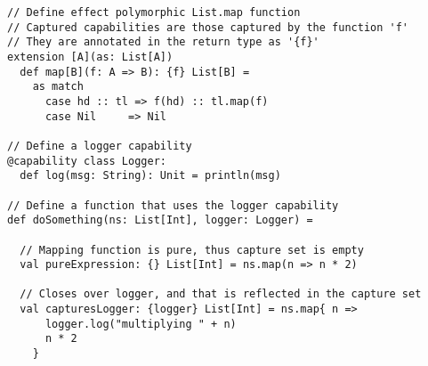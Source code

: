 \begin{algorithm}
\begin{verbatim}
// Define effect polymorphic List.map function
// Captured capabilities are those captured by the function 'f'
// They are annotated in the return type as '{f}'
extension [A](as: List[A])
  def map[B](f: A => B): {f} List[B] =
    as match
      case hd :: tl => f(hd) :: tl.map(f)
      case Nil     => Nil

// Define a logger capability
@capability class Logger:
  def log(msg: String): Unit = println(msg)

// Define a function that uses the logger capability
def doSomething(ns: List[Int], logger: Logger) =

  // Mapping function is pure, thus capture set is empty
  val pureExpression: {} List[Int] = ns.map(n => n * 2)

  // Closes over logger, and that is reflected in the capture set
  val capturesLogger: {logger} List[Int] = ns.map{ n =>
      logger.log("multiplying " + n)
      n * 2
    }
\end{verbatim}

\caption{Effect/capability polymorphism with capture checking in Scala 3%
\label{scala:cc-eff-polymorphism}}
\end{algorithm}
